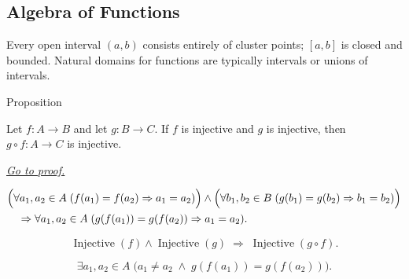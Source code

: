 
\subsection*{Algebra of Functions}
\label{sec:algebra-of-functions}
\begin{remark*}
Every open interval $(a,b)$ consists entirely of cluster points;
$[a,b]$ is closed and bounded. Natural domains for functions are
typically intervals or unions of intervals.
\end{remark*}


\begin{propositionbox}{Proposition}
\begin{proposition}
\label{prop:composition-injective}
Let $f:A\to B$ and let $g:B\to C$. If $f$ is injective and $g$ is
injective, then $g\circ f:A\to C$ is injective.

\smallskip\noindent
\hyperref[prf:composition-injective]{\textit{Go to proof.}}
\end{proposition}
\end{propositionbox}

\begin{remark*}
\[
\begin{aligned}
&\Bigl(\forall a_1,a_2\in A\;(f(a_1)=f(a_2)\Rightarrow a_1=a_2)\Bigr)
\wedge
\Bigl(\forall b_1,b_2\in B\;(g(b_1)=g(b_2)\Rightarrow b_1=b_2)\Bigr) \\
&\quad\Rightarrow
\forall a_1,a_2\in A\;(g(f(a_1))=g(f(a_2))\Rightarrow a_1=a_2).
\end{aligned}
\]
\end{remark*}

\begin{remark*}
\[
  \operatorname{Injective}(f)\wedge\operatorname{Injective}(g)
  \;\Longrightarrow\;
  \operatorname{Injective}(g\circ f).
\]
\end{remark*}

\begin{remark*}
\[
  \exists a_1,a_2\in A\;\bigl(a_1\neq a_2\;\wedge\;g(f(a_1))=g(f(a_2))\bigr).
\]
\end{remark*}

